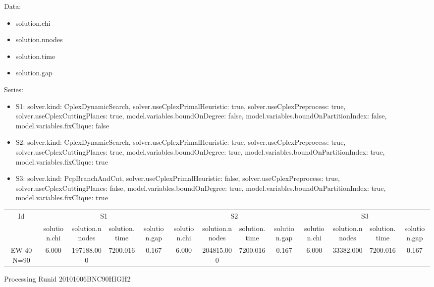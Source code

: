 \documentclass[landscape, 12pt]{report}
\begin{document}
Data:
\begin{itemize}
\item solution.chi
\item solution.nnodes
\item solution.time
\item solution.gap
\end{itemize}
Series:
\begin{itemize}
\item S1: solver.kind: CplexDynamicSearch, solver.useCplexPrimalHeuristic: true, solver.useCplexPreprocess: true, solver.useCplexCuttingPlanes: true, model.variables.boundOnDegree: false, model.variables.boundOnPartitionIndex: false, model.variables.fixClique: false
\item S2: solver.kind: CplexDynamicSearch, solver.useCplexPrimalHeuristic: true, solver.useCplexPreprocess: true, solver.useCplexCuttingPlanes: true, model.variables.boundOnDegree: true, model.variables.boundOnPartitionIndex: true, model.variables.fixClique: true
\item S3: solver.kind: PcpBranchAndCut, solver.useCplexPrimalHeuristic: false, solver.useCplexPreprocess: true, solver.useCplexCuttingPlanes: false, model.variables.boundOnDegree: true, model.variables.boundOnPartitionIndex: true, model.variables.fixClique: true
\end{itemize}
\begin{tabular}{|c|cccc|cccc|cccc|}
\hline
\multicolumn{1}{|c|}{Id} & \multicolumn{4}{|c|}{S1} & \multicolumn{4}{|c|}{S2} & \multicolumn{4}{|c|}{S3}
\\
 & solution.chi & solution.nnodes & solution.time & solution.gap & solution.chi & solution.nnodes & solution.time & solution.gap & solution.chi & solution.nnodes & solution.time & solution.gap
\\
\hline
EW 40 N=90 & 6.000 & 197188.000 & 7200.016 & 0.167 & 6.000 & 204815.000 & 7200.016 & 0.167 & 6.000 & 33382.000 & 7200.016 & 0.167
\\
\hline 
 \end{tabular}


Processing Runid 20101006BNC90HIGH2
\end{document}
